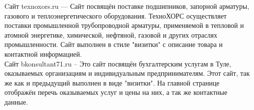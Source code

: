 \hspace{1.25cm}Cайт texnoxors.ru — Сайт посвящён поставке подшипников, запорной арматуры, газового и теплоэнергетического оборудования. ТехноХОРС осуществляет поставки промышленной трубопроводной арматуры, применяемой в тепловой и атомной энергетике, химической, нефтяной, газовой и других отраслях промышленности. Сайт выполнен в стиле "визитки" с описание товара и контактной информацией.
	\\
	Сайт bkonsultant71.ru – Это сайт посвящён бухгалтерским услугам в Туле, оказываемых организациям и индивидуальным предпринимателям. Этот сайт, так же как и предыдущий выполнен в виде "визитки". На главной странице 
	отображён перечь оказываемых услуг и цены на них, а так же контактные данные.
